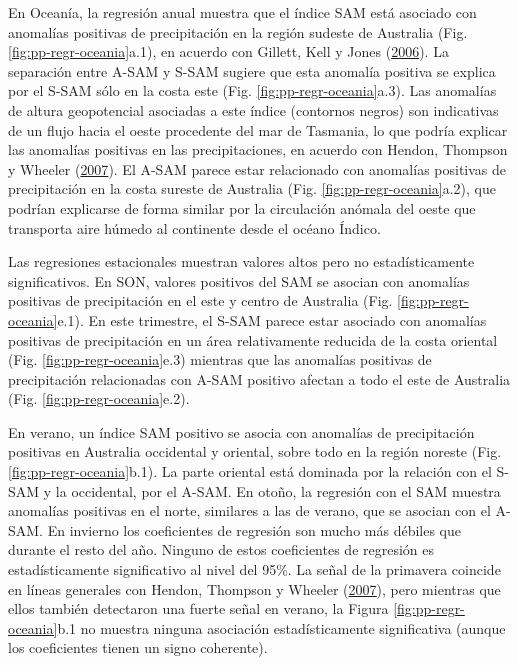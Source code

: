 \documentclass[12pt,oneside,a4paper]{reedthesis}
\begin{document}
En Oceanía, la regresión anual muestra que el índice SAM está asociado con anomalías positivas de precipitación en la región sudeste de Australia (Fig. \ref{fig:pp-regr-oceania}a.1), en acuerdo con Gillett, Kell y Jones (\protect\hyperlink{ref-gillett2006}{2006}).
La separación entre A-SAM y S-SAM sugiere que esta anomalía positiva se explica por el S-SAM sólo en la costa este (Fig. \ref{fig:pp-regr-oceania}a.3).
Las anomalías de altura geopotencial asociadas a este índice (contornos negros) son indicativas de un flujo hacia el oeste procedente del mar de Tasmania, lo que podría explicar las anomalías positivas en las precipitaciones, en acuerdo con Hendon, Thompson y Wheeler (\protect\hyperlink{ref-hendon2007}{2007}).
El A-SAM parece estar relacionado con anomalías positivas de precipitación en la costa sureste de Australia (Fig. \ref{fig:pp-regr-oceania}a.2), que podrían explicarse de forma similar por la circulación anómala del oeste que transporta aire húmedo al continente desde el océano Índico.

Las regresiones estacionales muestran valores altos pero no estadísticamente significativos.
En SON, valores positivos del SAM se asocian con anomalías positivas de precipitación en el este y centro de Australia (Fig. \ref{fig:pp-regr-oceania}e.1).
En este trimestre, el S-SAM parece estar asociado con anomalías positivas de precipitación en un área relativamente reducida de la costa oriental (Fig. \ref{fig:pp-regr-oceania}e.3) mientras que las anomalías positivas de precipitación relacionadas con A-SAM positivo afectan a todo el este de Australia (Fig. \ref{fig:pp-regr-oceania}e.2).

En verano, un índice SAM positivo se asocia con anomalías de precipitación positivas en Australia occidental y oriental, sobre todo en la región noreste (Fig. \ref{fig:pp-regr-oceania}b.1).
La parte oriental está dominada por la relación con el S-SAM y la occidental, por el A-SAM.
En otoño, la regresión con el SAM muestra anomalías positivas en el norte, similares a las de verano, que se asocian con el A-SAM.
En invierno los coeficientes de regresión son mucho más débiles que durante el resto del año.
Ninguno de estos coeficientes de regresión es estadísticamente significativo al nivel del 95\%.
La señal de la primavera coincide en líneas generales con Hendon, Thompson y Wheeler (\protect\hyperlink{ref-hendon2007}{2007}), pero mientras que ellos también detectaron una fuerte señal en verano, la Figura \ref{fig:pp-regr-oceania}b.1 no muestra ninguna asociación estadísticamente significativa (aunque los coeficientes tienen un signo coherente).
\end{document}
